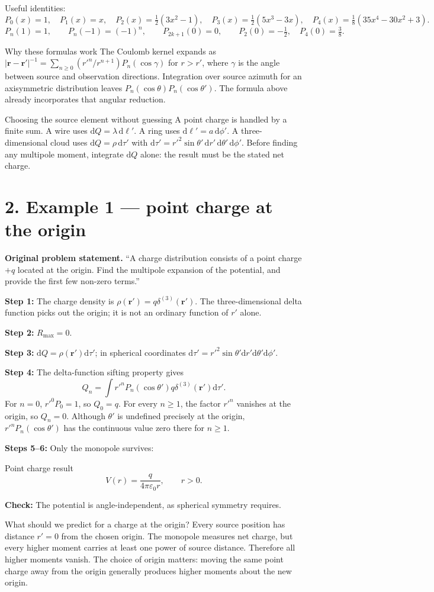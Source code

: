 \documentclass[10pt,letterpaper]{article}
\newcommand{\eps}{\varepsilon_0}\newcommand{\dd}{\mathrm d}
\begin{document}
Useful identities:
\[P_0(x)=1,\quad P_1(x)=x,\quad P_2(x)=\tfrac12(3x^2-1),\quad P_3(x)=\tfrac12(5x^3-3x),\quad P_4(x)=\tfrac18(35x^4-30x^2+3).\]
\[P_n(1)=1,\qquad P_n(-1)=(-1)^n,\qquad P_{2k+1}(0)=0,\qquad P_2(0)=-\tfrac12,\quad P_4(0)=\tfrac38.\]
\begin{insight}{Why these formulas work}
The Coulomb kernel expands as $|\mathbf r-\mathbf r'|^{-1}=\sum_{n\ge0}(r'^n/r^{n+1})P_n(\cos\gamma)$ for $r>r'$, where $\gamma$ is the angle between source and observation directions. Integration over source azimuth for an axisymmetric distribution leaves $P_n(\cos\theta)P_n(\cos\theta')$. The formula above already incorporates that angular reduction.
\end{insight}
\begin{insight}{Choosing the source element without guessing}
A point charge is handled by a finite sum. A wire uses $\dd Q=\lambda\,\dd\ell'$. A ring uses $\dd\ell'=a\,\dd\phi'$. A three-dimensional cloud uses $\dd Q=\rho\,\dd\tau'$ with $\dd\tau'=r'^2\sin\theta'\,\dd r'\,\dd\theta'\,\dd\phi'$. Before finding any multipole moment, integrate $\dd Q$ alone: the result must be the stated net charge.
\end{insight}
\section*{2. Example 1 --- point charge at the origin}
\textbf{Original problem statement.} ``A charge distribution consists of a point charge $+q$ located at the origin. Find the multipole expansion of the potential, and provide the first few non-zero terms.''

\textbf{Step 1:} The charge density is $\rho(\mathbf r')=q\delta^{(3)}(\mathbf r')$. The three-dimensional delta function picks out the origin; it is not an ordinary function of $r'$ alone.

\textbf{Step 2:} $R_{\max}=0$.

\textbf{Step 3:} $\dd Q=\rho(\mathbf r')\dd\tau'$; in spherical coordinates $\dd\tau'=r'^2\sin\theta'\dd r'\dd\theta'\dd\phi'$.

\textbf{Step 4:} The delta-function sifting property gives
\[Q_n=\int r'^nP_n(\cos\theta')q\delta^{(3)}(\mathbf r')\dd\tau'.\]
For $n=0$, $r'^0P_0=1$, so $Q_0=q$. For every $n\ge1$, the factor $r'^n$ vanishes at the origin, so $Q_n=0$. Although $\theta'$ is undefined precisely at the origin, $r'^nP_n(\cos\theta')$ has the continuous value zero there for $n\ge1$.

\textbf{Steps 5--6:} Only the monopole survives:
\begin{result}{Point charge result}\[\boxed{V(r)=\frac{q}{4\pi\eps r},\qquad r>0.}\]\end{result}
\textbf{Check:} The potential is angle-independent, as spherical symmetry requires.
\begin{insight}{What should we predict for a charge at the origin?}
Every source position has distance $r'=0$ from the chosen origin. The monopole measures net charge, but every higher moment carries at least one power of source distance. Therefore all higher moments vanish. The choice of origin matters: moving the same point charge away from the origin generally produces higher moments about the new origin.
\end{insight}
\end{document}
